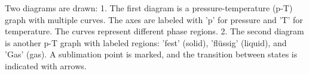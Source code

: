 Two diagrams are drawn:  
1. The first diagram is a pressure-temperature (p-T) graph with multiple curves. The axes are labeled with 'p' for pressure and 'T' for temperature. The curves represent different phase regions.  
2. The second diagram is another p-T graph with labeled regions: 'fest' (solid), 'flüssig' (liquid), and 'Gas' (gas). A sublimation point is marked, and the transition between states is indicated with arrows.